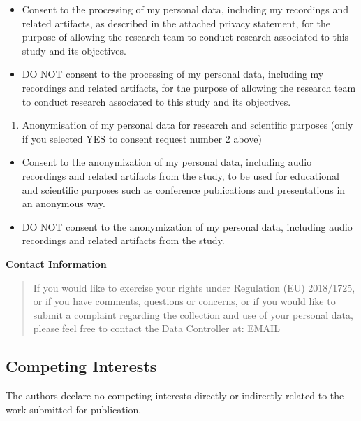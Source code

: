 \documentclass[
  11pt,
]{article}
\providecommand{\tightlist}{%
  \setlength{\itemsep}{0pt}\setlength{\parskip}{0pt}}
\begin{document}
\begin{itemize}
\tightlist
\item[$\square$]
  Consent to the processing of my personal data, including my recordings and related artifacts, as described in the attached privacy statement, for the purpose of allowing the research team to conduct research associated to this study and its objectives.
\item[$\square$]
  DO NOT consent to the processing of my personal data, including my recordings and related artifacts, for the purpose of allowing the research team to conduct research associated to this study and its objectives.
\end{itemize}

\begin{enumerate}
\def\labelenumi{(\arabic{enumi})}
\setcounter{enumi}{2}
\tightlist
\item
  Anonymisation of my personal data for research and scientific purposes (only if you selected YES to consent request number 2 above)
\end{enumerate}

\begin{itemize}
\tightlist
\item[$\square$]
  Consent to the anonymization of my personal data, including audio recordings and related artifacts from the study, to be used for educational and scientific purposes such as conference publications and presentations in an anonymous way.
\item[$\square$]
  DO NOT consent to the anonymization of my personal data, including audio recordings and related artifacts from the study.
\end{itemize}

\textbf{Contact Information}

\begin{quote}
If you would like to exercise your rights under Regulation (EU) 2018/1725, or if you have comments, questions or concerns, or if you would like to submit a complaint regarding the collection and use of your personal data, please feel free to contact the Data Controller at: EMAIL
\end{quote}

\subsection{Competing Interests}\label{competing-interests}

The authors declare no competing interests directly or indirectly related to the work submitted for publication.
\end{document}
